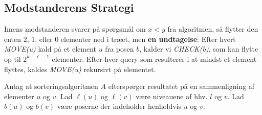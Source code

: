 \subsection{Modstanderens Strategi}%
\label{subsec:label}

Imens modstanderen svarer på spørgsmål om $x < y$ fra algoritmen, så flytter den enten 2, 1, eller 0 elementer ned i træet, men \textbf{en undtagelse}: Efter hvert \textit{MOVE(u)} kald på et element $u$ fra posen $b$, kalder vi \textit{CHECK(b)}, som kan flytte op til $2^{k-\ell -1}$ elementer. Efter hver query som resulterer i at mindst et element flyttes, kaldes \textit{MOVE(u)} rekursivt på elementet.

Antag at sorteringsalgoritmen $A$ efterspørger resultatet på en sammenligning af elementer $u$ og $v$. Lad \(\ell(u)\) og \(\ell(v)\) være niveauene af hhv. $l$ og $v$. Lad $b(u)$ og $b(v)$ være poserne der indeholder henholdvis $u$ og $v$.

